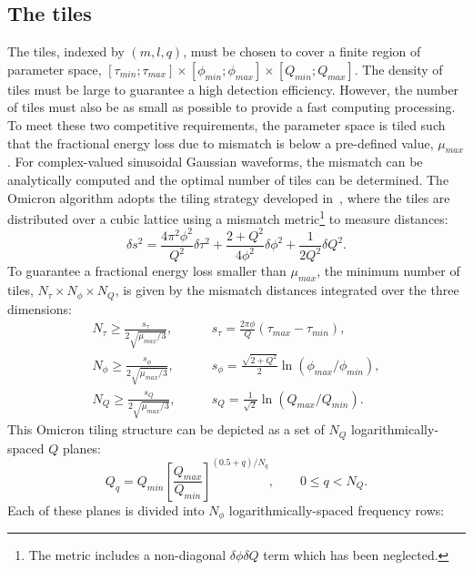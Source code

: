 \subsection{The tiles} \label{sec:method:tiles}
The tiles, indexed by $(m,l,q)$, must be chosen to cover a finite region of parameter space, $[\tau_{min};\tau_{max}]\times [\phi_{min};\phi_{max}] \times [Q_{min};Q_{max}]$. The density of tiles must be large to guarantee a high detection efficiency. However, the number of tiles must also be as small as possible to provide a fast computing processing. To meet these two competitive requirements, the parameter space is tiled such that the fractional energy loss due to mismatch is below a pre-defined value, $\mu_{max}$. For complex-valued sinusoidal Gaussian waveforms, the mismatch can be analytically computed and the optimal number of tiles can be determined. The Omicron algorithm adopts the tiling strategy developed in~\cite{Chatterji:2004}, where the tiles are distributed over a cubic lattice using a mismatch metric\footnote{The metric includes a non-diagonal $\delta \phi \delta Q$ term which has been neglected.} to measure distances:
\begin{equation}
  \delta s^2 =
  \frac{4\pi^2\phi^2}{Q^2}\delta \tau^2
  + \frac{2+Q^2}{4\phi^2}\delta \phi^2
  + \frac{1}{2Q^2}\delta Q^2.
  \label{eq:tilemetric}
\end{equation}
To guarantee a fractional energy loss smaller than $\mu_{max}$, the minimum number of tiles, $N_\tau \times N_\phi \times N_Q$, is given by the mismatch distances integrated over the three dimensions:
\begin{align}
  N_\tau \ge \frac{s_\tau}{2\sqrt{\mu_{max}/3}},  & \qquad s_\tau = \frac{2\pi\phi}{Q}(\tau_{max} - \tau_{min}), \label{eq:tiledistancetau} \\
  N_\phi \ge \frac{s_\phi}{2\sqrt{\mu_{max}/3}},  & \qquad s_\phi = \frac{\sqrt{2+Q^2}}{2}\ln(\phi_{max}/\phi_{min}), \label{eq:tiledistancephi} \\
  N_Q \ge \frac{s_Q}{2\sqrt{\mu_{max}/3}},  & \qquad s_Q = \frac{1}{\sqrt{2}}\ln(Q_{max}/Q_{min}). \label{eq:tiledistanceq}
\end{align}
This Omicron tiling structure can be depicted as a set of $N_Q$ logarithmically-spaced $Q$ planes:
\begin{equation}
  Q_q = Q_{min}\left[ \frac{Q_{max}}{Q_{min}}\right]^{(0.5+q)/N_q}, \qquad 0\le q < N_Q.
  \label{eq:q}
\end{equation}
Each of these planes is divided into $N_\phi$ logarithmically-spaced frequency rows:
